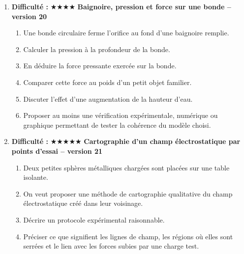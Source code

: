 \documentclass[11pt,a4paper]{article}
\newcommand{\etoiles}[1]{\textbf{Difficulté : }#1}
\begin{document}
\begin{enumerate}[label=\textbf{Problème long \arabic*.},leftmargin=*]
\textbf{Mouvement circulaire uniforme sur une trajectoire imposée -- version 19}
\begin{enumerate}[label=\alph*)]
\item Un mobile se déplace à vitesse de norme constante sur une trajectoire circulaire.
\item Montrer qualitativement que le vecteur vitesse change malgré la constance de sa norme.
\item Construire graphiquement le vecteur variation de vitesse entre deux instants voisins.
\item Relier cette variation à la somme des forces.
\item Discuter pourquoi ce cas contredit l'idée naïve ``vitesse constante donc pas de force''.
\item Proposer au moins une vérification expérimentale, numérique ou graphique permettant de tester la cohérence du modèle choisi.
\end{enumerate}
\item \etoiles{★★★★}
\textbf{Baignoire, pression et force sur une bonde -- version 20}
\begin{enumerate}[label=\alph*)]
\item Une bonde circulaire ferme l'orifice au fond d'une baignoire remplie.
\item Calculer la pression à la profondeur de la bonde.
\item En déduire la force pressante exercée sur la bonde.
\item Comparer cette force au poids d'un petit objet familier.
\item Discuter l'effet d'une augmentation de la hauteur d'eau.
\item Proposer au moins une vérification expérimentale, numérique ou graphique permettant de tester la cohérence du modèle choisi.
\end{enumerate}
\item \etoiles{★★★★★}
\textbf{Cartographie d'un champ électrostatique par points d'essai -- version 21}
\begin{enumerate}[label=\alph*)]
\item Deux petites sphères métalliques chargées sont placées sur une table isolante.
\item On veut proposer une méthode de cartographie qualitative du champ électrostatique créé dans leur voisinage.
\item Décrire un protocole expérimental raisonnable.
\item Préciser ce que signifient les lignes de champ, les régions où elles sont serrées et le lien avec les forces subies par une charge test.

\end{enumerate}
\end{enumerate}
\end{document}
